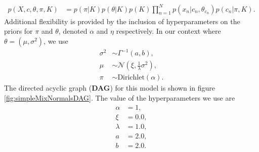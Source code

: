 \documentclass[]{article}
\begin{document}
\begin{align}
	p(X, c, \theta, \pi, K) &=  p(\pi | K) p(\theta | K) p(K) \prod_{n=1}^N p(x_n | c_n, \theta_{c_n}) p (c_n | \pi, K).  \label{eqn:jointMixModel}
\end{align}
Additional flexibility is provided by the inclusion of hyperparameters on the priors for $\pi$ and $\theta$, denoted $\alpha$ and $\eta$ respectively. In our context where $\theta=(\mu, \sigma^2)$, we use
\begin{align}
	\sigma^2 &\sim \Gamma^{-1}(a, b), \\
	\mu &\sim \mathcal{N}(\xi, \frac{1}{\lambda} \sigma^2), \\
	\pi &\sim \textrm{Dirichlet}(\alpha).
\end{align}
The directed acyclic graph (\textbf{DAG}) for this model is shown in figure \ref{fig:simpleMixNormalsDAG}. The value of the hyperparameters we use are
\begin{align}
	\alpha &= 1, \\
	\xi &= 0.0, \\
	\lambda &= 1.0,\\
	a &= 2.0,\\
	b &= 2.0.
\end{align}
\end{document}
